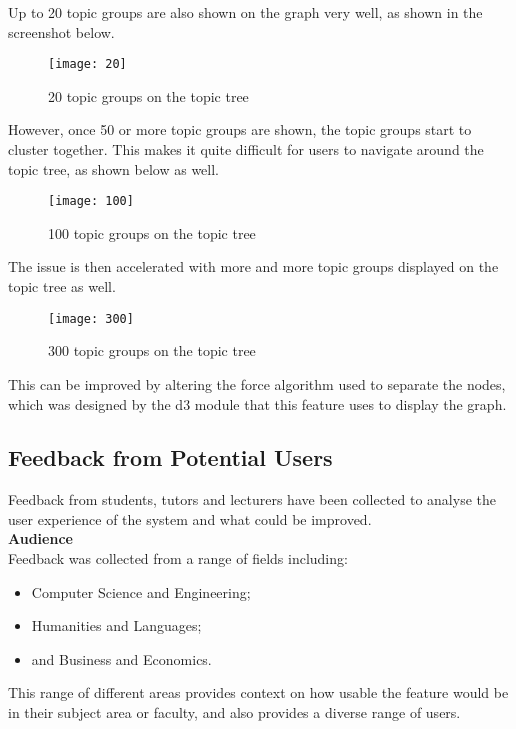 Up to 20 topic groups are also shown on the graph very well, as shown in the screenshot below.
\begin{figure}[h!]
    \centering
    \texttt{[image: 20]}
    \caption{20 topic groups on the topic tree}
\end{figure}

However, once 50 or more topic groups are shown, the topic groups start to cluster together. This makes it quite difficult for users to navigate around the topic tree, as shown below as well.

\begin{figure}[h!]
    \centering
    \texttt{[image: 100]}
    \caption{100 topic groups on the topic tree}
\end{figure}

The issue is then accelerated with more and more topic groups displayed on the topic tree as well.

\begin{figure}[h!]
    \centering
    \texttt{[image: 300]}
    \caption{300 topic groups on the topic tree}
\end{figure}

This can be improved by altering the force algorithm used to separate the nodes, which was designed by the d3 module that this feature uses to display the graph. 

\subsection{Feedback from Potential Users}
Feedback from students, tutors and lecturers have been collected to analyse the user experience of the system and what could be improved. \\

\textbf{Audience} \\

Feedback was collected from a range of fields including:\\
\begin{itemize}
    \item Computer Science and Engineering;
    \item Humanities and Languages;
    \item and Business and Economics.
\end{itemize}

This range of different areas provides context on how usable the feature would be in their subject area or faculty, and also provides a diverse range of users.\\

